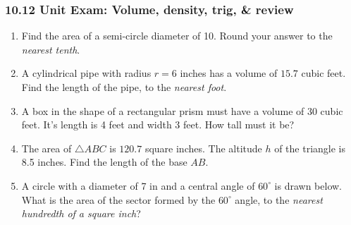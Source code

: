 \documentclass[12pt, twoside]{article}
\begin{document}
\subsubsection*{10.12 Unit Exam: Volume, density, trig, \& review}
 \begin{enumerate}

  \item Find the area of a semi-circle diameter of 10. Round your answer to the  \emph{nearest tenth}.\vspace{3cm}

  \item A cylindrical pipe with radius $r=6$ inches has a volume of $15.7$ cubic feet. Find the length of the pipe, to the \emph{nearest foot}. \vspace{3.5cm}
  \item A box in the shape of a rectangular prism must have a volume of 30 cubic feet. It's length is 4 feet and width 3 feet. How tall must it be? \vspace{3.0cm}

  \item The area of $\triangle ABC$ is $120.7$ square inches. The altitude $h$ of the triangle is 8.5 inches. Find the length of the base $AB$.\\[0.5cm]
   \vspace{0.5cm}

\newpage

  \item A circle with a diameter of 7 in and a central angle of $60^\circ$ is drawn below. What is the area of the sector formed by the $60^\circ$ angle, to the \emph{nearest hundredth of a square inch}?
   \vspace{1.5cm}


\end{enumerate}
\end{document}
